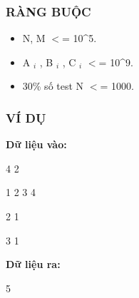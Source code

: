 \subsubsection{   RÀNG BUỘC  }
\begin{itemize}
	\item     N, M $<$= 10\textasciicircum5.   
	\item     A    $_     i    $    , B    $_     i    $    , C    $_     i    $    $<$= 10\textasciicircum9.   
	\item     30\% số test N $<$= 1000.   
\end{itemize}

\subsubsection{   VÍ DỤ  }

\textbf{    Dữ liệu vào:   }

   4 2  

   1 2 3 4  

   2 1  

   3 1  

\textbf{    Dữ liệu ra:   }

   5  